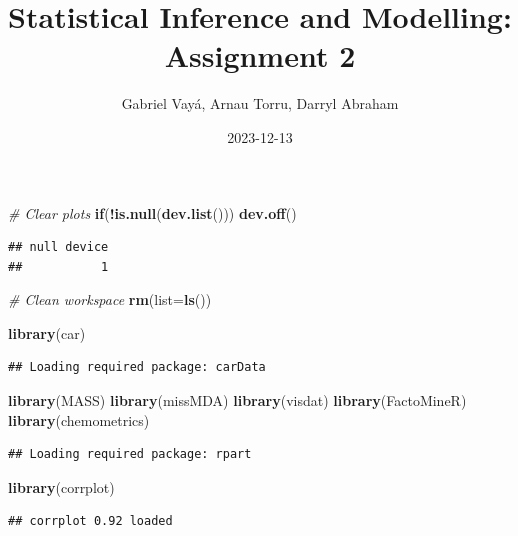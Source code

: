 \documentclass[
]{article}
\title{Statistical Inference and Modelling: Assignment 2}
\author{Gabriel Vayá, Arnau Torru, Darryl Abraham}
\date{2023-12-13}
\newenvironment{Shaded}{\begin{snugshade}}{\end{snugshade}}
\newcommand{\AttributeTok}[1]{\textcolor[rgb]{0.13,0.29,0.53}{#1}}
\newcommand{\CommentTok}[1]{\textcolor[rgb]{0.56,0.35,0.01}{\textit{#1}}}
\newcommand{\ControlFlowTok}[1]{\textcolor[rgb]{0.13,0.29,0.53}{\textbf{#1}}}
\newcommand{\FunctionTok}[1]{\textcolor[rgb]{0.13,0.29,0.53}{\textbf{#1}}}
\newcommand{\NormalTok}[1]{#1}
\newcommand{\SpecialCharTok}[1]{\textcolor[rgb]{0.81,0.36,0.00}{\textbf{#1}}}
\begin{document}
\maketitle

{
\setcounter{tocdepth}{3}
\tableofcontents
}
\begin{Shaded}
\begin{Highlighting}[]
\CommentTok{\# Clear plots}
\ControlFlowTok{if}\NormalTok{(}\SpecialCharTok{!}\FunctionTok{is.null}\NormalTok{(}\FunctionTok{dev.list}\NormalTok{())) }\FunctionTok{dev.off}\NormalTok{()}
\end{Highlighting}
\end{Shaded}

\begin{verbatim}
## null device 
##           1
\end{verbatim}

\begin{Shaded}
\begin{Highlighting}[]
\CommentTok{\# Clean workspace}
\FunctionTok{rm}\NormalTok{(}\AttributeTok{list=}\FunctionTok{ls}\NormalTok{())}

\FunctionTok{library}\NormalTok{(car)}
\end{Highlighting}
\end{Shaded}

\begin{verbatim}
## Loading required package: carData
\end{verbatim}

\begin{Shaded}
\begin{Highlighting}[]
\FunctionTok{library}\NormalTok{(MASS)}
\FunctionTok{library}\NormalTok{(missMDA)}
\FunctionTok{library}\NormalTok{(visdat)}
\FunctionTok{library}\NormalTok{(FactoMineR)}
\FunctionTok{library}\NormalTok{(chemometrics)}
\end{Highlighting}
\end{Shaded}

\begin{verbatim}
## Loading required package: rpart
\end{verbatim}

\begin{Shaded}
\begin{Highlighting}[]
\FunctionTok{library}\NormalTok{(corrplot)}
\end{Highlighting}
\end{Shaded}

\begin{verbatim}
## corrplot 0.92 loaded
\end{verbatim}
\end{document}
